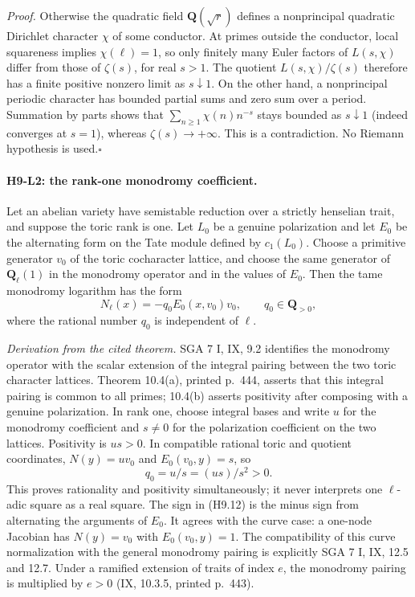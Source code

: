 \emph{Proof.} Otherwise the quadratic field $\mathbf Q(\sqrt r)$
defines a nonprincipal quadratic Dirichlet character $\chi$ of some
conductor. At primes outside the conductor, local squareness implies
$\chi(\ell)=1$, so only finitely many Euler factors of $L(s,\chi)$
differ from those of $\zeta(s)$, for real $s>1$. The quotient
$L(s,\chi)/\zeta(s)$ therefore has a finite positive nonzero limit as
$s\downarrow1$. On the other hand, a nonprincipal periodic character
has bounded partial sums and zero sum over a period. Summation by parts
shows that $\sum_{n\ge1}\chi(n)n^{-s}$ stays bounded as $s\downarrow1$
(indeed converges at $s=1$), whereas $\zeta(s)\to+\infty$.
This is a contradiction. No Riemann hypothesis is used.\hfill$\square$

\paragraph{H9-L2: the rank-one monodromy coefficient.}
Let an abelian variety have semistable reduction over a strictly
henselian trait, and suppose the toric rank is one. Let $L_0$ be a
genuine polarization and let $E_0$ be the alternating form on the Tate
module defined by $c_1(L_0)$. Choose a primitive generator $v_0$ of the
toric cocharacter lattice, and choose the same generator of
$\mathbf Q_\ell(1)$ in the monodromy operator and in the values of $E_0$.
Then the tame monodromy logarithm has the form
\[
 N_\ell(x)=-q_0 E_0(x,v_0)v_0,\qquad q_0\in\mathbf Q_{>0},
                                                        \tag{H9.12}
\]
where the rational number $q_0$ is independent of $\ell$.

\emph{Derivation from the cited theorem.} SGA 7 I, IX, 9.2 identifies
the monodromy operator with the scalar extension of the integral
pairing between the two toric character lattices. Theorem 10.4(a),
printed p.~444, asserts that this integral pairing is common to all
primes; 10.4(b) asserts positivity after composing with a genuine
polarization. In rank one, choose integral bases and write $u$ for
the monodromy coefficient and $s\ne0$ for the polarization coefficient
on the two lattices. Positivity is $us>0$. In compatible rational toric
and quotient coordinates, $N(y)=u v_0$ and $E_0(v_0,y)=s$, so
\[
 q_0=u/s=(us)/s^2>0.
\]
This proves rationality and positivity simultaneously; it never interprets
one $\ell$-adic square as a real square. The sign in (H9.12) is the minus
sign from alternating the arguments of $E_0$. It agrees with the curve
case: a one-node Jacobian has $N(y)=v_0$ with
$E_0(v_0,y)=1$. The compatibility of this curve normalization with
the general monodromy pairing is explicitly SGA 7 I, IX, 12.5 and 12.7.
Under a ramified extension of traits of index $e$, the monodromy pairing
is multiplied by $e>0$ (IX, 10.3.5, printed p.~443).

